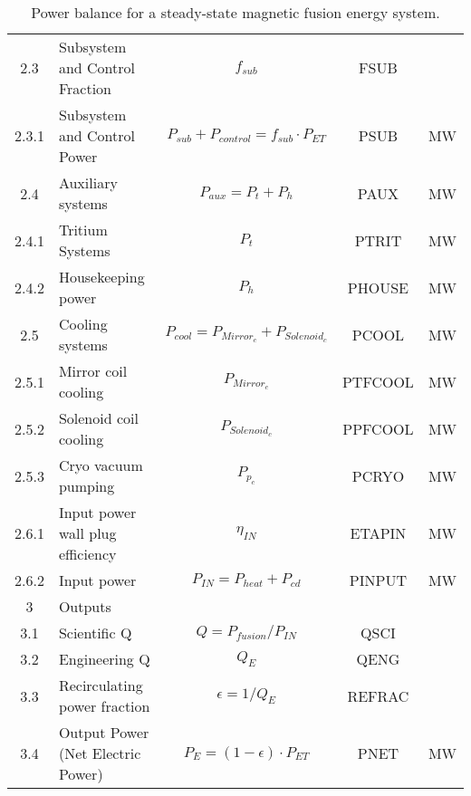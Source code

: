\begin{table}[ht!]
\begin{tabular}{|c|p{5cm}|c|c|c|}
2.3	&	Subsystem and Control Fraction	&	$f_{{sub}}$	&	FSUB	&	\\
2.3.1	&	Subsystem and Control Power	&	$P_{{sub}} + P_{{control}} = f_{{sub}} \cdot P_{{ET}}$	&	PSUB	&	MW \\
2.4	&	Auxiliary systems	&	$P_{{aux}} = P_{{t}} + P_{{h}}$	&	PAUX	&	MW \\
2.4.1	&	Tritium Systems	&	$P_{{t}}$	&	PTRIT	&	MW \\
2.4.2	&	Housekeeping power	&	$P_{{h}}$	&	PHOUSE	&	MW \\
2.5	&	Cooling systems	&	$P_{{cool}} = P_{{Mirror}_c} + P_{{Solenoid}_c}$	&	PCOOL	&	MW \\
2.5.1	&	Mirror coil cooling	&	$P_{{Mirror}_c}$	&	PTFCOOL	&	MW \\
2.5.2	&	Solenoid coil cooling	&	$P_{{Solenoid}_c}$	&	PPFCOOL	&	MW \\
2.5.3	&	Cryo vacuum pumping	&	$P_{{p}_c}$	&	PCRYO	&	MW \\
2.6.1	& Input power wall plug efficiency &	$\eta_{IN}$ & ETAPIN	&	MW \\
2.6.2	& Input power	& $P_{IN} = P_{heat} + P_{cd}$	&	PINPUT	&	MW \\
\hline								
3	&	Outputs	&		&		&	\\
\hline
3.1	&	Scientific Q	&	$Q = P_{{fusion}}/P_{{IN}}$	&	QSCI	&	\\
3.2	&	Engineering Q	&	$Q_{{E}}$	&	QENG	&	\\
3.3	&	Recirculating power fraction	&	$\epsilon = 1/Q_{{E}}$	&	REFRAC	&	\\
3.4	&	Output Power (Net Electric Power)	&	$P_{{E}} = (1 - \epsilon) \cdot P_{{ET}}$	&	PNET	&	MW \\
\hline								
\end{tabular}	
\caption{Power balance for a steady-state magnetic fusion energy system.}
\label{tab:powerbalance}
\end{table}



